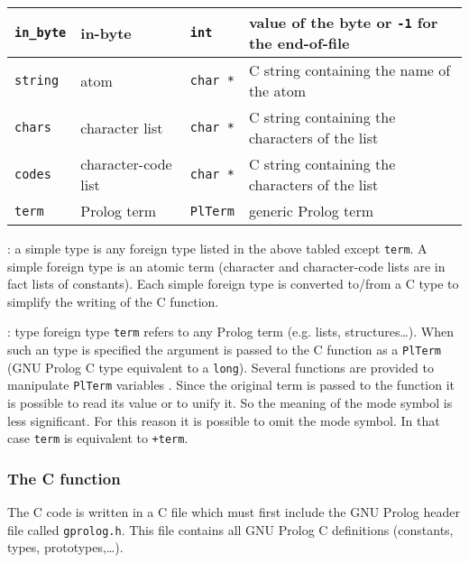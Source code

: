 \begin{tabular}{|l|l|l|l|}
\hline

\texttt{in\_byte} & in-byte & \texttt{int} & value of the byte or
\texttt{-1} for the end-of-file \\

\hline

\texttt{string} & atom & \texttt{char *} & C string containing the name of
the atom \\

\hline

\texttt{chars} & character list & \texttt{char *} & C string containing the
characters of the list \\

\hline

\texttt{codes} & character-code list & \texttt{char *} & C string containing
the characters of the list \\

\hline

\texttt{term} & Prolog term & \texttt{PlTerm} & generic Prolog term \\

\hline
\end{tabular}

: a simple type is any foreign type listed in
the above tabled except \texttt{term}. A simple foreign type is an atomic
term (character and character-code lists are in fact lists of constants).
Each simple foreign type is converted to/from a C type to simplify the
writing of the C function.

: type foreign type \texttt{term} refers to any
Prolog term (e.g. lists, structures\ldots). When such an type is
specified the argument is passed to the C function as a \texttt{PlTerm}
(GNU Prolog C type equivalent to a \texttt{long}). Several functions are
provided to manipulate \texttt{PlTerm} variables . Since the original term is passed to the function it is
possible to read its value or to unify it. So the meaning of the mode symbol
is less significant. For this reason it is possible to omit the mode symbol.
In that case \texttt{term} is equivalent to \texttt{+term}.

\subsubsection{The C function}
The C code is written in a C file which must first include the GNU Prolog
header file called \texttt{gprolog.h}. This file contains all GNU Prolog C
definitions (constants, types, prototypes,\ldots). 

